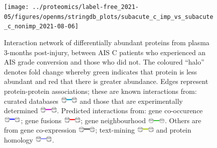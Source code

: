 \documentclass[
]{article}
\begin{document}
\begin{figure}
\texttt{[image: ../proteomics/label-free\_2021-05/figures/openms/stringdb\_plots/subacute\_c\_imp\_vs\_subacute\_c\_nonimp\_2021-08-06]} \caption{Interaction network of differentially abundant proteins from plasma 3-months post-injury, between AIS C patients who experienced an AIS grade conversion and those who did not. The coloured ``halo'' denotes fold change whereby green indicates that protein is less abundant and red that there is greater abundance. Edges represent protein-protein associations; these are known interactions from: curated databases \includegraphics[width=0.08\textwidth,height=0.02\textheight]{Images/stringdb_curated_db.png} and those that are experimentally determined \includegraphics[width=0.08\textwidth,height=0.02\textheight]{Images/stringdb_experimentally_determined.png}. Predicted interactions from: gene co-occurence \includegraphics[width=0.08\textwidth,height=0.02\textheight]{Images/stringdb_gene_co-occurrence.png}; gene fusions \includegraphics[width=0.08\textwidth,height=0.02\textheight]{Images/stringdb_gene_fusions.png}; gene neighbourhood \includegraphics[width=0.08\textwidth,height=0.02\textheight]{Images/stringdb_gene_neighbour.png}. Others are from gene co-expression \includegraphics[width=0.08\textwidth,height=0.02\textheight]{Images/stringdb_co-expression.png}; text-mining \includegraphics[width=0.08\textwidth,height=0.02\textheight]{Images/stringdb_text_mining.png} and protein homology \includegraphics[width=0.08\textwidth,height=0.02\textheight]{Images/stringdb_protein-homology.png}.}\label{fig:openms-stringdb-chap4-sub-cs}
\end{figure}
\end{document}
